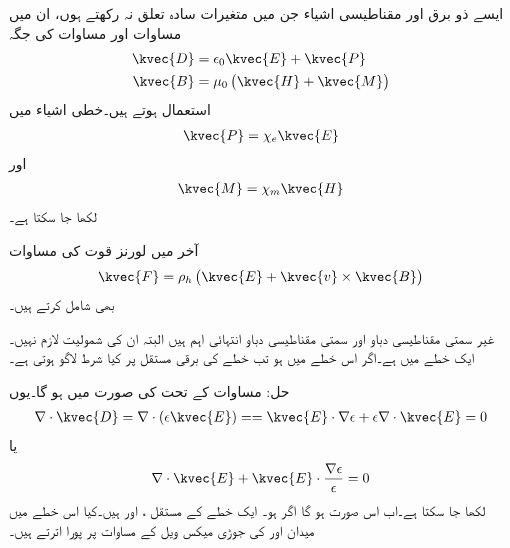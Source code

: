 ایسے ذو برق اور مقناطیسی اشیاء جن میں متغیرات سادہ تعلق نہ رکھتے ہوں، ان میں مساوات  اور مساوات  کی جگہ
\begin{align}
\kvec{D}&=\epsilon_0 \kvec{E}+\kvec{P}\\
\kvec{B}&=\mu_0 \left(\kvec{H}+\kvec{M} \right)
\end{align}
استعمال ہوتے ہیں۔خطی اشیاء میں
\begin{align}
\kvec{P}=\chi_e \kvec{E}
\end{align}
اور
\begin{align}
\kvec{M}=\chi_m \kvec{H}
\end{align}
لکھا جا سکتا ہے۔

آخر میں لورنز قوت کی مساوات 
\begin{align}
\kvec{F}=\rho_h \left(\kvec{E}+\kvec{v} \times \kvec{B} \right)
\end{align}
بھی شامل کرتے ہیں۔

غیر سمتی مقناطیسی دباو  اور سمتی مقناطیسی دباو  انتہائی اہم ہیں البتہ ان کی شمولیت لازم نہیں۔
ایک خطے میں  ہے۔اگر اس خطے میں  ہو تب خطے کی برقی مستقل  پر کیا شرط لاگو ہوتی ہے۔

حل: مساوات  کے تحت  کی صورت میں  ہو گا۔یوں
\begin{align*}
\nabla \cdot \kvec{D}=\nabla \cdot (\epsilon \kvec{E})==\kvec{E} \cdot \nabla \epsilon+\epsilon \nabla \cdot \kvec{E}=0
\end{align*}
یا
\begin{align*}
\nabla \cdot \kvec{E}+\kvec{E} \cdot \frac{\nabla \epsilon}{\epsilon}=0
\end{align*}
لکھا جا سکتا ہے۔اب  اس صورت ہو گا اگر  ہو۔
ایک خطے کے مستقل ،  اور  ہیں۔کیا اس خطے میں میدان  اور  کی جوڑی میکس ویل کے مساوات پر پورا اترتے ہیں۔

